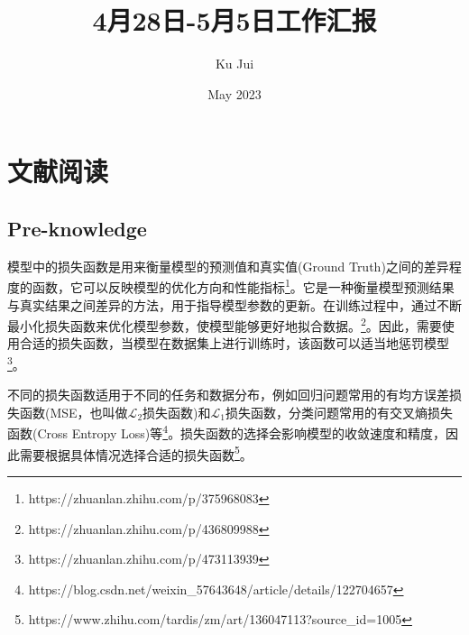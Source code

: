 \documentclass[letterpaper,12pt]{article}
\begin{document}
	
	
	\title{\songti {}4月28日-5月5日工作汇报}
	\author{\textrm{Ku Jui}}
	\date{\textrm{May 2023}}
	\maketitle
	
	\renewcommand{\figurename}{Figure} %
	\renewcommand{\contentsname}{Contents}
	
	\tableofcontents  %
	
	\section{文献阅读}

	\subsection{Pre-knowledge}
	
	模型中的损失函数是用来衡量模型的预测值和真实值(Ground Truth)之间的差异程度的函数，它可以反映模型的优化方向和性能指标\footnote{https://zhuanlan.zhihu.com/p/375968083}。它是一种衡量模型预测结果与真实结果之间差异的方法，用于指导模型参数的更新。在训练过程中，通过不断最小化损失函数来优化模型参数，使模型能够更好地拟合数据。\footnote{https://zhuanlan.zhihu.com/p/436809988}。因此，需要使用合适的损失函数，当模型在数据集上进行训练时，该函数可以适当地惩罚模型 \footnote{https://zhuanlan.zhihu.com/p/473113939}。
	
	不同的损失函数适用于不同的任务和数据分布，例如回归问题常用的有均方误差损失函数(MSE，也叫做$\mathcal{L}_{2}$损失函数)和$\mathcal{L}_{1}$损失函数，分类问题常用的有交叉熵损失函数(Cross Entropy Loss)等\footnote{https://blog.csdn.net/weixin\_57643648/article/details/122704657}。损失函数的选择会影响模型的收敛速度和精度，因此需要根据具体情况选择合适的损失函数\footnote{https://www.zhihu.com/tardis/zm/art/136047113?source\_id=1005}。
	
\end{document}
